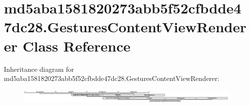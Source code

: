 \hypertarget{classmd5aba1581820273abb5f52cfbdde47dc28_1_1GesturesContentViewRenderer}{}\section{md5aba1581820273abb5f52cfbdde47dc28.\+Gestures\+Content\+View\+Renderer Class Reference}
\label{classmd5aba1581820273abb5f52cfbdde47dc28_1_1GesturesContentViewRenderer}
Inheritance diagram for md5aba1581820273abb5f52cfbdde47dc28.\+Gestures\+Content\+View\+Renderer\+:\begin{figure}[H]
\begin{center}
\leavevmode
\includegraphics[height=0.728929cm]{classmd5aba1581820273abb5f52cfbdde47dc28_1_1GesturesContentViewRenderer}
\end{center}
\end{figure}
